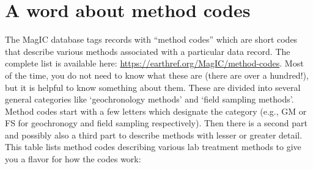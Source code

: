 \documentclass[11pt]{book}
\begin{document}
{{{

  \section{A word about  method codes}

  The MagIC database tags records with ``method codes'' which are short codes that describe various methods associated with a particular data record.  The complete list is available here:  \url{https://earthref.org/MagIC/method-codes}.      Most of the time, you do not need to know what these are (there are over a hundred!), but it is helpful to know something about them.  These are divided into several general categories like `geochronology methods' and  `field sampling methods'.   Method codes start with a few letters which designate the category (e.g., GM or FS  for geochronogy and field sampling respectively).   Then there is a second part and possibly also a third part to describe methods with lesser or greater detail.
This table lists method codes describing various lab treatment methods to give you a flavor for how the codes work:

}}}
\end{document}
